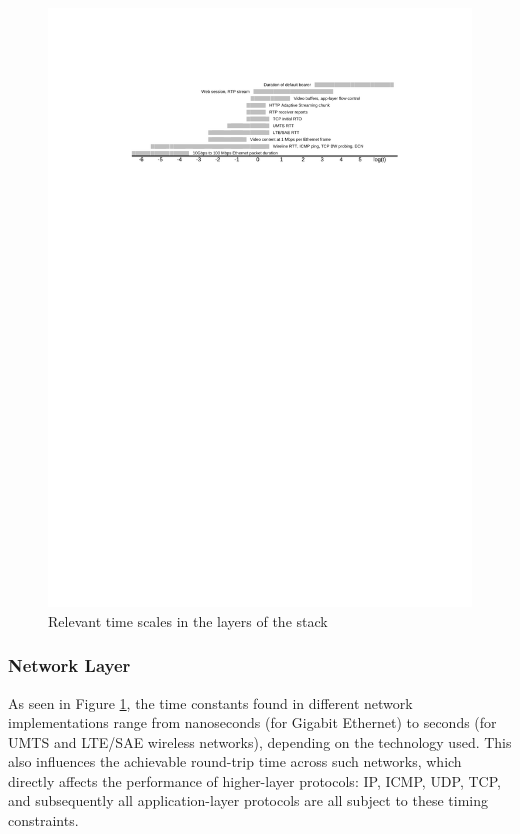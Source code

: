 \begin{figure}[htbp]
	\includegraphics[width=\textwidth]{images/timescales.pdf}
	\caption{Relevant time scales in the layers of the stack}
	\label{c3:fig:timescales}
\end{figure}


\subsubsection{Network Layer}

As seen in Figure \ref{c3:fig:timescales}, the time constants found in different network implementations range from nanoseconds (for Gigabit Ethernet) to seconds (for UMTS and \gls{LTE}/\gls{SAE} wireless networks), depending on the technology used. This also influences the achievable round-trip time across such networks, which directly affects the performance of higher-layer protocols: \gls{IP}, \gls{ICMP}, \gls{UDP}, \gls{TCP}, and subsequently all application-layer protocols are all subject to these timing constraints.

